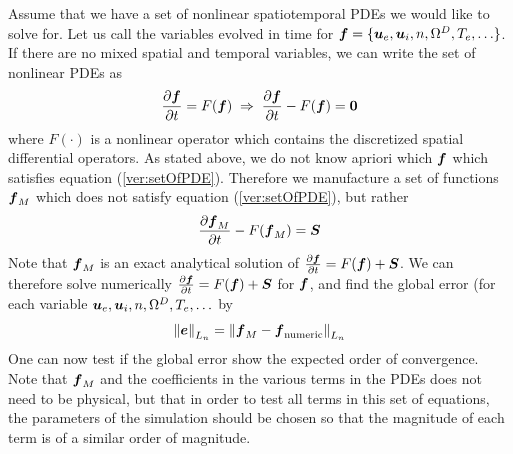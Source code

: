 Assume that we have a set of nonlinear spatiotemporal PDEs we would like to solve for.
Let us call the variables evolved in time for $\boldsymbol{f}=\{\boldsymbol{u}_e, \boldsymbol{u}_i, n, \Omega^D, T_e, \ldots\}$.
If there are no mixed spatial and temporal variables, we can write the set of nonlinear PDEs as
%
\begin{align}
  \frac{\partial {\boldsymbol{f}}}{\partial{t}} = F(\boldsymbol{f}) \; \Rightarrow \; \frac{\partial {\boldsymbol{f}}}{\partial{t}} - F(\boldsymbol{f}) = \boldsymbol{0}
  \label{ver:setOfPDE}
\end{align}
%
where $F(\cdot)$ is a nonlinear operator which contains the discretized spatial differential operators.
As stated above, we do not know apriori which $\boldsymbol{f}$ which satisfies equation (\ref{ver:setOfPDE}).
Therefore we manufacture a set of functions $\boldsymbol{f}_M$ which does not satisfy equation (\ref{ver:setOfPDE}), but rather
%
\begin{align*}
    \frac{\partial {\boldsymbol{f}_M}}{\partial{t}} - F(\boldsymbol{f}_M) = \boldsymbol{S}
\end{align*}
%
Note that $\boldsymbol{f}_M$ is an exact analytical solution of $\frac{\partial {\boldsymbol{f}}}{\partial{t}} = F(\boldsymbol{f}) + \boldsymbol{S}$.
We can therefore solve numerically $\frac{\partial {\boldsymbol{f}}}{\partial{t}} = F(\boldsymbol{f}) + \boldsymbol{S}$ for $\boldsymbol{f}$, and find the global error (for each variable $\boldsymbol{u}_e, \boldsymbol{u}_i, n, \Omega^D, T_e, \ldots$ by
%
\begin{align*}
    \left\|\boldsymbol{e}\right\|_{L_n} =
    \left\|\boldsymbol{f}_{M} - \boldsymbol{f}_{\text{numeric}}\right\|_{L_n}
\end{align*}
%
One can now test if the global error show the expected order of convergence.
Note that $\boldsymbol{f}_M$ and the coefficients in the various terms in the PDEs does not need to be physical, but that in order to test all terms in this set of equations, the parameters of the simulation should be chosen so that the magnitude of each term is of a similar order of magnitude.

